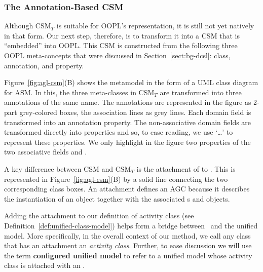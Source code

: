 \subsubsection{The Annotation-Based CSM}
\label{sect:agl-csm}

Although CSM$_T$ is suitable for OOPL's representation, it is still not yet natively in that form. Our next step, therefore, is to transform it into a CSM that is ``embedded'' into OOPL. This CSM is constructed from the following three OOPL meta-concepts that were discussed in Section~\ref{sect:bg-dcsl}: class, annotation, and property.


Figure~\ref{fig:agl-csm}(B) shows the metamodel in the form of a UML class diagram for ASM. In this, the three meta-classes in CSM$_T$ are transformed into three annotations of the same name. The annotations are represented in the figure as 2-part grey-colored boxes, the association lines as grey lines. Each domain field is transformed into an annotation property. The non-associative domain fields are transformed directly into properties and so, to ease reading, we use `\dots' to represent these properties. We only highlight in the figure two properties of the two associative fields  and . 

A key difference between CSM and CSM$_T$ is the attachment of  to . This is represented in Figure~\ref{fig:agl-csm}(B) by a solid line connecting the two corresponding class boxes. An  attachment defines an AGC because it describes the instantiation of an  object together with the associated s and  objects.

Adding the  attachment to our definition of activity class (see Definition~\ref{def:unified-class-model}) helps form a bridge between \agl~and the unified model. More specifically, in the overall context of our method, we call any class that has an  attachment an \textit{activity class}.
Further, to ease discussion we will use the term \textbf{configured unified model} to refer to a unified model whose activity class is attached with an . 
%
